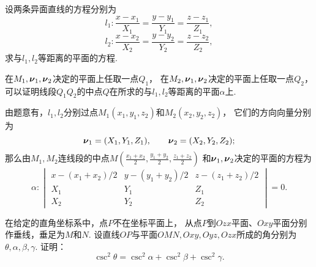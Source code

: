 \begin{figure}[hb]
	\centering
	\caption{}
	\label{figure:解析几何.直线与平面的夹角}
\end{figure}

\begin{example}
设两条异面直线的方程分别为\[
	l_1: \frac{x-x_1}{X_1} = \frac{y-y_1}{Y_1} = \frac{z-z_1}{Z_1},
\]\[
	l_2: \frac{x-x_2}{X_2} = \frac{y-y_2}{Y_2} = \frac{z-z_2}{Z_2},
\]
求与\(l_1,l_2\)等距离的平面的方程.
\begin{solution}
在\(M_1,\boldsymbol{\nu}_1,\boldsymbol{\nu}_2\)决定的平面上任取一点\(Q_1\)，
在\(M_2,\boldsymbol{\nu}_1,\boldsymbol{\nu}_2\)决定的平面上任取一点\(Q_2\)，
可以证明线段\(Q_1 Q_2\)的中点\(Q\)在所求的与\(l_1,l_2\)等距离的平面\(\alpha\)上.

由题意有，\(l_1,l_2\)分别过点\(M_1(x_1,y_1,z_2)\)和\(M_2(x_2,y_2,z_2)\)，
它们的方向向量分别为\[
	\boldsymbol{\nu}_1 = (X_1,Y_1,Z_1), \qquad
	\boldsymbol{\nu}_2 = (X_2,Y_2,Z_2);
\]
那么由\(M_1,M_2\)连线段的中点\(M\left(
	\frac{x_1+x_2}{2},
	\frac{y_1+y_2}{2},
	\frac{z_1+z_2}{2}
\right)\)
和\(\boldsymbol{\nu}_1,\boldsymbol{\nu}_2\)决定的平面的方程为\[
	\alpha: \begin{vmatrix}
		x - (x_1+x_2)/2 & y - (y_1+y_2)/2 & z - (z_1+z_2)/2 \\
		X_1 & Y_1 & Z_1 \\
		X_2 & Y_2 & Z_2
	\end{vmatrix} = 0.
\]
\end{solution}
\end{example}

\begin{example}
在给定的直角坐标系中，点\(P\)不在坐标平面上，
从点\(P\)到\(Ozx\)平面、\(Oxy\)平面分别作垂线，垂足为\(M\)和\(N\).
设直线\(OP\)与平面\(OMN,Oxy,Oyz,Ozx\)所成的角分别为\(\theta,\alpha,\beta,\gamma\).
证明：\[
	\csc^2\theta = \csc^2\alpha+\csc^2\beta+\csc^2\gamma.
\]
\end{example}

